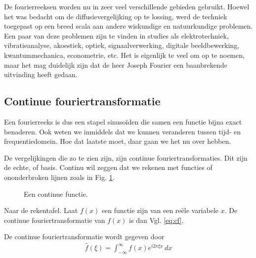 \documentclass[11pt,fleqn]{book} %
\begin{document}
De fourierreeksen worden nu in zeer veel verschillende gebieden gebruikt. Hoewel het was bedacht om de diffusievergelijking op te lossing, werd de techniek toegepast op een breed scala aan andere wiskundige en natuurkundige problemen. Een paar van deze problemen zijn te vinden in studies als elektrotechniek, vibratieanalyse, akoestiek, optiek, signaalverwerking, digitale beeldbewerking, kwantummechanica, econometrie, etc. Het is eigenlijk te veel om op te noemen, maar het mag duidelijk zijn dat de heer Joseph Fourier een baanbrekende uitvinding heeft gedaan.

\subsection{Continue fouriertransformatie}
Een fourierreeks is dus een stapel sinusoïden die samen een functie bijna exact benaderen. Ook weten we inmiddels dat we kunnen veranderen tussen tijd- en frequentiedomein. Hoe dat laatste moet, daar gaan we het nu over hebben.

De vergelijkingen die zo te zien zijn, zijn continue fouriertransformaties. Dit zijn de echte, of basis. Continu wil zeggen dat we rekenen met functies of ononderbroken lijnen zoals in Fig. \ref{fig:fx}.

\begin{figure}
\centering
{}
\caption{Een continue functie.}
\label{fig:fx}
\end{figure}

Naar de rekentafel. Laat $f(x)$ een functie zijn van een reële variabele $x$. De continue fouriertransformatie van $f(x)$ is dan Vgl. \ref{eq:cf}.
\begin{definition}\label{eq:cf}
De continue fouriertransformatie wordt gegeven door
\begin{align}
\hat{f}(\xi)=\int_{-\infty}^\infty f(x)e^{i2\pi \xi x} \, dx
\end{align}
\end{definition}
\end{document}
